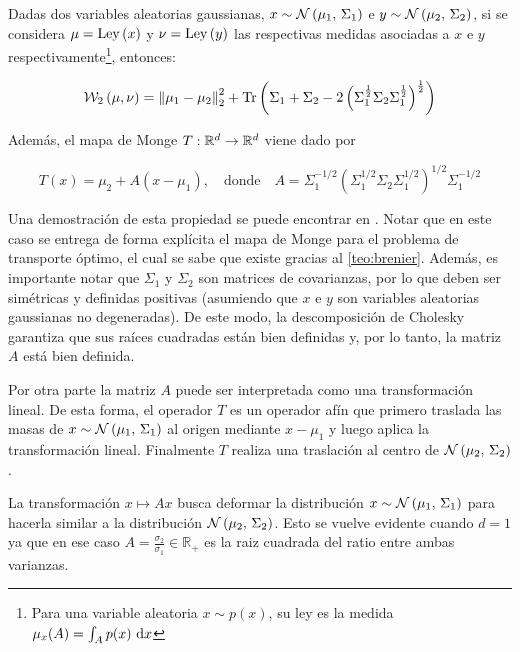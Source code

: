 \begin{teo}
	\label{teo:frechet_gaussian}
	Dadas dos variables aleatorias gaussianas, $x\sim\mathcal{N}\left(\mu_1,\,\Sigma_1\right)$ e $y\sim \mathcal{N}\left(\mu_2,\,\Sigma_2\right)$, si se considera $\mu=\operatorname{Ley}\left(x\right)$ y $\nu=\operatorname{Ley}\left(y\right)$ las respectivas medidas asociadas a $x$ e $y$ respectivamente\footnote{Para una variable aleatoria $x\sim p(x)$, su ley es la medida $\mu_x(A)=\int_A p(x)\,\operatorname{d}\! x$}, entonces:

	\begin{equation}
		\mathcal{W}_{2}\left(\mu,\nu\right) = \left\lVert \mu_1-\mu_2 \right\rVert_2^2 + \operatorname{Tr}\left(\Sigma_1+\Sigma_2 - 2\left(\Sigma_1^\frac{1}{2}\Sigma_2\Sigma_1^\frac{1}{2}\right)^\frac{1}{2}\right)
	\end{equation}

	Además, el mapa de Monge $T:\mathbb{R}^d\to\mathbb{R}^d$ viene dado por

	\begin{equation*}
		T(x) = \mu_2 + A(x - \mu_1),
		\quad\text{donde}\quad
		A = \Sigma_1^{-1/2}\left(\Sigma_1^{1/2} \Sigma_2 \Sigma_1^{1/2}\right)^{1/2}\Sigma_1^{-1/2}
	\end{equation*}
\end{teo}

Una demostración de esta propiedad se puede encontrar en \cite{peyré2020computational}. Notar que en este caso se entrega de forma explícita el mapa de Monge para el problema de transporte óptimo, el cual se sabe que existe gracias al \autoref{teo:brenier}. Además, es importante notar que $\Sigma_1$ y $\Sigma_2$ son matrices de covarianzas, por lo que deben ser simétricas y definidas positivas (asumiendo que $x$ e $y$ son variables aleatorias gaussianas no degeneradas). De este modo, la descomposición de Cholesky garantiza que sus raíces cuadradas están bien definidas y, por lo tanto, la matriz $A$ está bien definida.

Por otra parte la matriz $A$ puede ser interpretada como una transformación lineal. De esta forma, el operador $T$ es un operador afín que primero traslada las masas de $x\sim \mathcal{N}\left(\mu_1,\,\Sigma_1\right)$ al origen mediante $x-\mu_1$ y luego aplica la transformación lineal. Finalmente $T$ realiza una traslación al centro de $\mathcal{N}\left(\mu_2,\,\Sigma_2\right)$.

La transformación $x\mapsto Ax$ busca deformar la distribución $x\sim \mathcal{N}\left(\mu_1,\,\Sigma_1\right)$ para hacerla similar a la distribución $\mathcal{N}\left(\mu_2,\,\Sigma_2\right)$. Esto se vuelve evidente cuando $d=1$ ya que en ese caso $A=\frac{\sigma_2}{\sigma_1} \in\mathbb{R}_+$ es la raiz cuadrada del ratio entre ambas varianzas.

